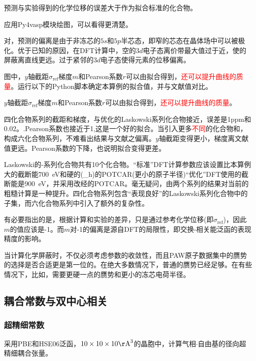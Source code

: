 预测与实验得到的化学位移的误差大于作为拟合标准的化合物。

应用\textrm{Py4vasp}模块绘图，可以看得更清楚。

对，预测的偏离是由于非冻芯的$5s$和$5p$半芯态，即窄的芯态在晶体场中可以被极化。优于已知的原因，在\textrm{DFT}计算中，空的$3d$电子态离价带最大值过于近，使的屏蔽离直线更远。过于紧邻的$3d$电子态使得元素的位移偏离。

图中，$y$轴截距$\sigma_{\mathrm{ref}}$梯度$m$和\textrm{Pearson}系数$r$可以由拟合得到，\textcolor{red}{还可以提升曲线的质量}。运行以下的\textrm{Python}脚本确定本算例的拟合值，并与文献值对比。

$y$轴截距$\sigma_{\mathrm{ref}}$梯度$m$和\textrm{Pearson}系数$r$可以由拟合得到，\textcolor{red}{还可以提升曲线的质量}。%

四化合物系列的截距和梯度，与优化的\textrm{Laskowski}系列化合物接近，误差是\textrm{1ppm}和0.02。.\textrm{Pearson}系数也接近于1,这是一个好的拟合。当引入更多\textcolor{red}{不同}的化合物和，构成六化合物系列，不难看出结果与文献之偏离。$y$轴截距变得更小，梯度离文献值更远。\textrm{Pearson}系数的下降，也说明拟合变得更差。

\textrm{Laskowski}的-系列化合物共有10个化合物。``标准''\textrm{DFT}计算参数应该设置比本算例大的截断能\textrm{700~eV}和硬的\textrm{(\_h)}的\textrm{POTCAR}(更小的原子半径)``优化''\textrm{DFT}使用的截断能是\textrm{900~eV}，并采用改经的\textrm{POTCAR}。毫无疑问，由两个系列的结果对当前的粗糙计算是一种提升。四化合物系列包含``表现良好''的\textrm{Laskowski}系列化合物中的子集，而六化合物系列中引入了额外的复杂性。

有必要指出的是，根据计算和实验的差异，只是通过参考化学位移(即$\sigma_{\mathrm{ref}}$)，因此$m$的值应该是-1。而$m$对-1的偏离是源自\textrm{DFT}的局限性，即交换-相关能泛函的表现精度的影响。

当计算化学屏蔽时，不仅必须考虑参数的收敛性，而且\textrm{PAW}原子数据集中的赝势的选择是否合适更是第一位的。在绝大多数情况下，普通的赝势已经足够。在有些情况下，比如，需要更硬一点的赝势和更小的冻芯电荷半径。

\subsection{耦合常数与双中心相关}
\subsubsection{超精细常数}
采用\textrm{PBE}和\textrm{HSE06}泛函，$10\times10\times10\mathrm{\AA}^3$的晶胞中，计算气相$\cdot$自由基的径向超精细耦合张量。

